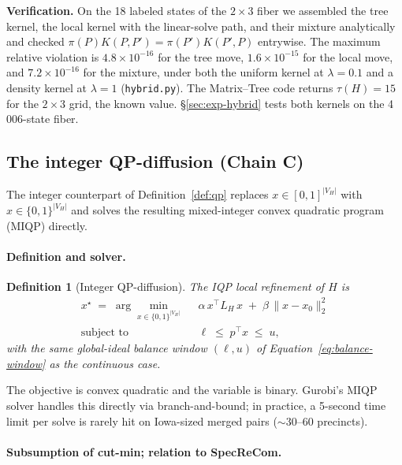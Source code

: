 \documentclass[11pt]{article}
\newtheorem{definition}{Definition}[section]
\begin{document}
\textbf{Verification.} On the 18 labeled states of the $2 \times 3$
fiber we assembled the tree kernel, the local kernel with the
linear-solve path, and their mixture analytically and checked
$\pi(P)K(P,P') = \pi(P')K(P',P)$ entrywise. The maximum relative
violation is $4.8 \times 10^{-16}$ for the tree move,
$1.6 \times 10^{-15}$ for the local move, and $7.2 \times 10^{-16}$
for the mixture, under both the uniform kernel at $\lambda = 0.1$ and
a density kernel at $\lambda = 1$ (\texttt{hybrid.py}). The
Matrix--Tree code returns $\tau(H) = 15$ for the $2 \times 3$ grid,
the known value. \S\ref{sec:exp-hybrid} tests both kernels on the
4\,006-state fiber.

\subsection{The integer QP-diffusion (Chain C)}\label{sec:iqp}

The integer counterpart of Definition~\ref{def:qp} replaces
$x \in [0,1]^{|V_H|}$ with $x \in \{0, 1\}^{|V_H|}$ and solves the
resulting mixed-integer convex quadratic program (MIQP) directly.

\paragraph{Definition and solver.}\label{sec:iqp-def}

\begin{definition}[Integer QP-diffusion]\label{def:iqp}
The IQP local refinement of $H$ is
\begin{align}
  x^\star \;=\; \arg\min_{x \in \{0,1\}^{|V_H|}} \;\;
    & \alpha\, x^\top L_H\, x \;+\; \beta\, \|x - x_0\|_2^2 \label{eq:iqp-obj} \\
  \text{subject to} \;\;
    & \ell \;\le\; p^\top x \;\le\; u,
\end{align}
with the same global-ideal balance window $(\ell, u)$ of
Equation~\eqref{eq:balance-window} as the continuous case.
\end{definition}

The objective is convex quadratic and the variable is binary.
Gurobi's MIQP solver handles this directly via branch-and-bound; in
practice, a 5-second time limit per solve is rarely hit on Iowa-sized
merged pairs ($\sim 30$--$60$ precincts).

\paragraph{Subsumption of cut-min; relation to SpecReCom.}\label{sec:iqp-subsumption}
\end{document}
